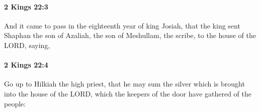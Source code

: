 		\paragraph{2 Kings 22:3} %
			\label{2KINGS-22-3}

			And it came to pass in the eighteenth year of king Josiah, that the king sent Shaphan the son of Azaliah, the son of Meshullam, the scribe, to the house of the LORD, saying,


		\paragraph{2 Kings 22:4} %
			\label{2KINGS-22-4}

			Go up to Hilkiah the high priest, that he may sum the silver which is brought into the house of the LORD, which the keepers of the door have gathered of the people:



